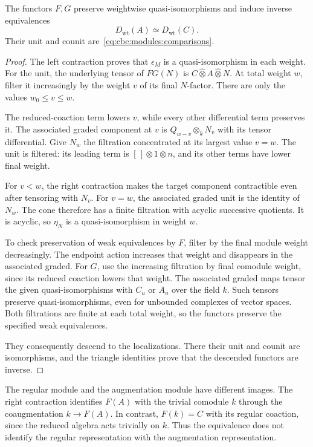 \begin{theorem}\label{cbc:modules:equivalence}
The functors $F,G$ preserve weightwise quasi-isomorphisms and induce inverse equivalences
\[
 D_{\mathrm{wt}}(A)\simeq D_{\mathrm{wt}}(C).
\]
Their unit and counit are~\eqref{eq:cbc:modules:comparisons}.
\end{theorem}
\begin{proof}
The left contraction proves that $\epsilon_M$ is a quasi-isomorphism in each weight.
For the unit, the underlying tensor of $FG(N)$ is $C\widehat\otimes A\widehat\otimes N$.
At total weight $w$, filter it increasingly by the weight $v$ of its final $N$-factor.
There are only the values $w_0\leq v\leq w$.

The reduced-coaction term lowers $v$, while every other differential term preserves it.
The associated graded component at $v$ is $Q_{w-v}\otimes_k N_v$ with its tensor differential.
Give $N_w$ the filtration concentrated at its largest value $v=w$.
The unit is filtered: its leading term is $[\,]\otimes1\otimes n$, and its other terms have lower final weight.

For $v<w$, the right contraction makes the target component contractible even after tensoring with $N_v$.
For $v=w$, the associated graded unit is the identity of $N_w$.
The cone therefore has a finite filtration with acyclic successive quotients.
It is acyclic, so $\eta_N$ is a quasi-isomorphism in weight $w$.

To check preservation of weak equivalences by $F$, filter by the final module weight decreasingly.
The endpoint action increases that weight and disappears in the associated graded.
For $G$, use the increasing filtration by final comodule weight, since its reduced coaction lowers that weight.
The associated graded maps tensor the given quasi-isomorphisms with $C_u$ or $A_u$ over the field $k$.
Such tensors preserve quasi-isomorphisms, even for unbounded complexes of vector spaces.
Both filtrations are finite at each total weight, so the functors preserve the specified weak equivalences.

They consequently descend to the localizations.
There their unit and counit are isomorphisms, and the triangle identities prove that the descended functors are inverse.
\end{proof}

The regular module and the augmentation module have different images.
The right contraction identifies $F(A)$ with the trivial comodule $k$ through the coaugmentation $k\to F(A)$.
In contrast, $F(k)=C$ with its regular coaction, since the reduced algebra acts trivially on $k$.
Thus the equivalence does not identify the regular representation with the augmentation representation.

